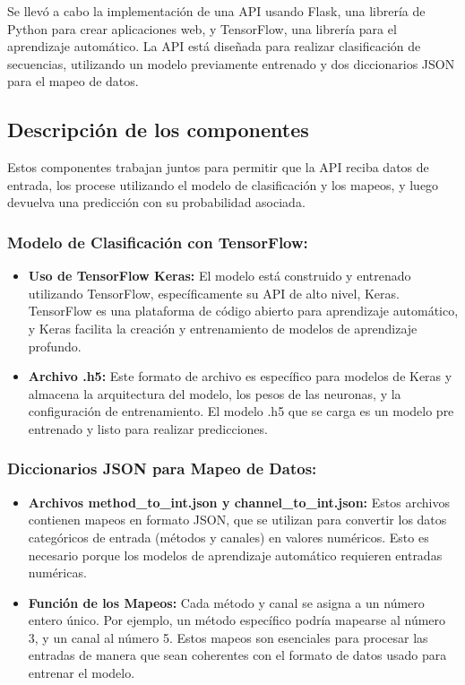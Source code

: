 Se llevó a cabo la implementación de una API usando Flask, una librería de Python para crear aplicaciones web, y TensorFlow, una librería para el aprendizaje automático. La API está diseñada para realizar clasificación de secuencias, utilizando un modelo previamente entrenado y dos diccionarios JSON para el mapeo de datos.

\subsection{Descripción de los componentes}

Estos componentes trabajan juntos para permitir que la API reciba datos de entrada, los procese utilizando el modelo de clasificación y los mapeos, y luego devuelva una predicción con su probabilidad asociada.

\subsubsection{Modelo de Clasificación con TensorFlow:}

\begin{itemize}
    \item \textbf{Uso de TensorFlow Keras:} El modelo está construido y entrenado utilizando TensorFlow, específicamente su API de alto nivel, Keras. TensorFlow es una plataforma de código abierto para aprendizaje automático, y Keras facilita la creación y entrenamiento de modelos de aprendizaje profundo.
    \item \textbf{Archivo .h5:} Este formato de archivo es específico para modelos de Keras y almacena la arquitectura del modelo, los pesos de las neuronas, y la configuración de entrenamiento. El modelo .h5 que se carga es un modelo pre entrenado y listo para realizar predicciones.
\end{itemize}

\subsubsection{Diccionarios JSON para Mapeo de Datos:}

\begin{itemize}
    \item \textbf{Archivos method\_to\_int.json y channel\_to\_int.json:} Estos archivos contienen mapeos en formato JSON, que se utilizan para convertir los datos categóricos de entrada (métodos y canales) en valores numéricos. Esto es necesario porque los modelos de aprendizaje automático requieren entradas numéricas.
    \item \textbf{Función de los Mapeos:} Cada método y canal se asigna a un número entero único. Por ejemplo, un método específico podría mapearse al número 3, y un canal al número 5. Estos mapeos son esenciales para procesar las entradas de manera que sean coherentes con el formato de datos usado para entrenar el modelo.
\end{itemize}


